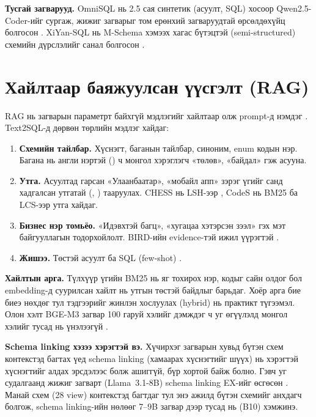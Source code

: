 \textbf{Тусгай загварууд.} OmniSQL нь 2.5 сая синтетик (асуулт, SQL) хосоор Qwen2.5-Coder-ийг сургаж, жижиг загварыг
том ерөнхий загваруудтай өрсөлдөхүйц болгосон \cite{li_2025_omnisql, hui_2024_qwen25_coder}. XiYan-SQL нь M-Schema
хэмээх хагас бүтэцтэй (semi-structured) схемийн дүрслэлийг санал болгосон \cite{gao_2024_xiyan_sql}.

\section{Хайлтаар баяжуулсан үүсгэлт (RAG)}
\label{sec:rag}

RAG нь загварын параметрт байхгүй мэдлэгийг хайлтаар олж prompt-д нэмдэг \cite{lewis_2020_rag}. Text2SQL-д дөрвөн
төрлийн мэдлэг хайдаг:
\begin{enumerate}
  \item \textbf{Схемийн тайлбар.} Хүснэгт, баганын тайлбар, синоним, enum кодын нэр. Багана нь англи нэртэй
        () ч монгол хэрэглэгч «төлөв», «байдал» гэж асууна.
  \item \textbf{Утга.} Асуултад гарсан «Улаанбаатар», «мобайл апп» зэрэг үгийг санд хадгалсан утгатай
        (, ) тааруулах. CHESS нь LSH-ээр \cite{talaei_2024_chess}, CodeS нь BM25 ба
        LCS-ээр \cite{li_2024_codes} утга хайдаг.
  \item \textbf{Бизнес нэр томьёо.} «Идэвхтэй багц», «хугацаа хэтэрсэн зээл» гэх мэт байгууллагын тодорхойлолт. BIRD-ийн
        evidence-тэй ижил үүрэгтэй \cite{li_2023_bird}.
  \item \textbf{Жишээ.} Төстэй асуулт ба SQL (few-shot) \cite{gao_2024_dail_sql}.
\end{enumerate}

\textbf{Хайлтын арга.} Түлхүүр үгийн BM25 \cite{robertson_2009_bm25} нь яг тохирох нэр, кодыг сайн олдог бол
embedding-д суурилсан хайлт нь утгын төстэй байдлыг барьдаг. Хоёр арга бие биеэ нөхдөг тул тэдгээрийг жинлэн
хослуулах (hybrid) нь практикт түгээмэл. Олон хэлт BGE-M3 загвар 100 гаруй хэлийг дэмждэг ч уг өгүүлэлд монгол хэлийг
тусад нь үнэлээгүй \cite{chen_2024_bge_m3}.

\textbf{Schema linking хэзээ хэрэгтэй вэ.} Хүчирхэг загварын хувьд бүтэн схем контекстэд багтах үед schema linking
(хамаарах хүснэгтийг шүүх) нь хэрэгтэй хүснэгтийг алдах эрсдэлээс болж ашиггүй, бүр хортой байж болно. Гэвч уг
судалгаанд жижиг загварт (Llama~3.1-8B) schema linking EX-ийг өсгөсөн \cite{maamari_2024_death_schema_linking}.
Манай схем (28 view) контекстэд багтдаг тул энэ ажилд бүтэн схемийг анхдагч болгож, schema linking-ийн нөлөөг 7--9B
загвар дээр тусад нь (B10) хэмжинэ.

